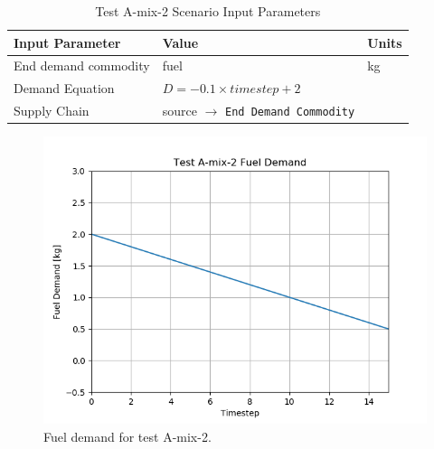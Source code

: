 \documentclass[11pt,letterpaper]{article}
\begin{document}
\begin{table}[H]
	\centering
	\caption{Test A-mix-2 Scenario Input Parameters }
	\label{tab:testA-mix-2}
	\begin{tabular}{|l|l|l|}
		\hline
		\textbf{Input Parameter} & \textbf{Value} & \textbf{Units} \\
		\hline
		End demand commodity & fuel & kg \\
		Demand Equation & $D = -0.1 \times timestep + 2$ & \\
		Supply Chain & source $\rightarrow$ \texttt{End Demand Commodity} &  \\
		\hline
	\end{tabular}
\end{table}

\begin{figure}[H]
	\begin{center}
		\includegraphics[scale=0.7]{./images/A-mix-2.png}
	\end{center}
	\caption{Fuel demand for test A-mix-2.}
	\label{fig:A-mix-2}
\end{figure}
\end{document}
